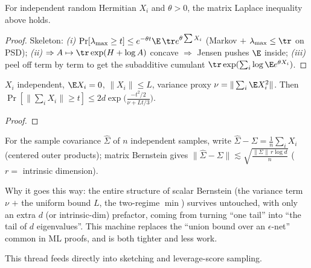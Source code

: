 
\begin{theorem}\label{thm:matrix-laplace}
For independent random Hermitian $X_i$ and $\theta>0$, the matrix Laplace inequality above holds.
\end{theorem}
\begin{proof}
Skeleton: \emph{(i)} $\Pr[\lambda_{\max}\ge t]\le e^{-\theta t}\E\,\tr e^{\theta\sum X_i}$ (Markov $+$ $\lambda_{\max}\le\tr$ on PSD);
\emph{(ii)}  $\Rightarrow A\mapsto \tr\exp(H+\log A)$ concave $\Rightarrow$ Jensen pushes $\E$ inside;
\emph{(iii)} peel off term by term to get the subadditive cumulant $\tr\exp(\sum_i\log\E e^{\theta X_i})$.
\end{proof}

\begin{theorem}\label{thm:matrix-bernstein}
$X_i$ independent, $\E X_i=0$, $\|X_i\|\le L$, variance proxy $\nu=\|\sum_i\E X_i^2\|$. Then
$\Pr[\|\sum_i X_i\|\ge t]\le 2d\exp\!\big(\tfrac{-t^2/2}{\nu+Lt/3}\big)$.
\end{theorem}
\begin{proof}\end{proof}

\begin{example}\label{ex:covariance}
For the sample covariance $\widehat\Sigma$ of $n$ independent samples, write $\widehat\Sigma-\Sigma=\frac1n\sum_i X_i$ (centered outer products);
matrix Bernstein gives $\|\widehat\Sigma-\Sigma\|\lesssim\sqrt{\tfrac{\|\Sigma\|\,r\log d}{n}}$ ($r=$ intrinsic dimension).
\end{example}

\begin{strand}
Why it goes this way: the entire structure of scalar Bernstein (the variance term $\nu$ $+$ the uniform bound $L$,
the two-regime $\min$) survives untouched, with only an extra $d$ (or intrinsic-dim) prefactor, coming from turning
``one tail'' into ``the tail of $d$ eigenvalues''. This machine replaces the ``union bound over an $\epsilon$-net''
common in ML proofs, and is both tighter and less work.
\end{strand}

%
 This thread feeds directly into sketching and leverage-score sampling. 
